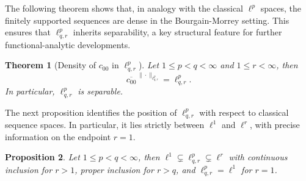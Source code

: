 \documentclass[preprint,12pt]{elsarticle}
\newtheorem{theorem}{Theorem}[section]
\newtheorem{proposition}[theorem]{Proposition}
\begin{document}
The following theorem shows that, in analogy with the classical $\ell^p$ spaces, 
the finitely supported sequences are dense in the Bourgain-Morrey setting. 
This ensures that $\ell^{p}_{q,r}$ inherits separability, a key structural feature 
for further functional-analytic developments.
\begin{theorem}[Density of $c_{00}$ in $\ell^{p}_{q,r}$]\label{Density}
Let $1\leq p<q<\infty$ and $1\leq r<\infty$, then
\begin{equation*}
\overline{c_{00}}^{\,\|\cdot\|_{\ell^{p}_{q,r}}}=\ell^{p}_{q,r}.
\end{equation*}
In particular, $\ell^p_{q,r}$ is separable.
\end{theorem}
The next proposition identifies the position of $\ell^{p}_{q,r}$ with respect 
to classical sequence spaces. In particular, it lies strictly between $\ell^1$ 
and $\ell^r$, with precise information on the endpoint $r=1$.
\begin{proposition}
    Let $1\leq p<q<\infty$, then $\ell^{1}\subsetneq \ell^{p}_{q,r}\subsetneq \ell^{r}$ with continuous inclusion for $r>1$, proper inclusion for $r>q$, and $\ell^{p}_{q,r}=\ell^{1}$ for $r=1$.
\end{proposition}
\end{document}
